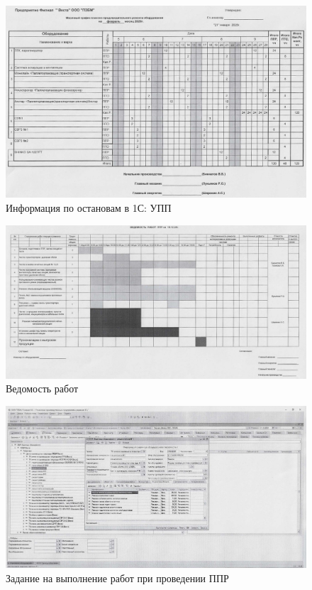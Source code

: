 \begin{figure}
\begin{center}
 \includegraphics[height=0.4\textheight, keepaspectratio]{Pics/XII.2.jpg}
\end{center}
 \caption{Информация по остановам в 1С: УПП}
 \label{pic:XII.2.jpg}
\end{figure}

\begin{figure}
\begin{center}
 \includegraphics[height=0.35\textheight, keepaspectratio]{Pics/XII.3.jpg}
\end{center}
 \caption{Ведомость работ}
 \label{pic:XII.3.jpg}
\end{figure}

\begin{figure}
\begin{center}
 \includegraphics[height=0.37\textheight, keepaspectratio]{Pics/XII.4.jpg}
\end{center}
 \caption{Задание на выполнение работ при проведении ППР}
 \label{pic:XII.4.jpg}
\end{figure}

